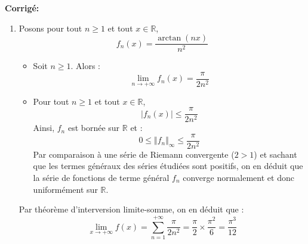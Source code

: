 \documentclass[a4paper,twoside,french,11pt]{VcCours}
\newcommand{\corr}{\textbf{Corrigé:}}
\begin{document}
\corr \begin{enumerate}
\item Posons pour tout $n \geq 1$ et tout $x \in \mathbb{R}$,
$$ f_n(x) =  \dfrac{\arctan(nx)}{n^2}$$
\begin{itemize}
\item Soit $n \geq 1$. Alors :
$$ \lim_{n \rightarrow + \infty} f_n(x) = \dfrac{\pi}{2 n^2} $$
\item Pour tout $n \geq 1$ et tout $x \in \mathbb{R}$,
$$ \vert f_n(x) \vert \leq \dfrac{\pi}{2n^2}$$
Ainsi, $f_n$ est bornée sur $\mathbb{R}$ et :
$$ 0 \leq \Vert f_n \Vert_{ \infty} \leq \dfrac{\pi}{2n^2}$$
Par comparaison à une série de Riemann convergente ($2>1$) et sachant que les termes généraux des séries étudiées sont positifs, on en déduit que la série de fonctions de terme général $f_n$ converge normalement et donc uniformément sur $\mathbb{R}$.
\end{itemize}
Par théorème d'interversion limite-somme, on en déduit que :
$$ \lim_{x \rightarrow + \infty} f(x) = \sum_{n=1}^{+ \infty} \dfrac{\pi}{2n^2} = \dfrac{\pi}{2} \times \dfrac{\pi^2}{6} = \dfrac{\pi^3}{12}$$


\end{enumerate}
\end{document}
